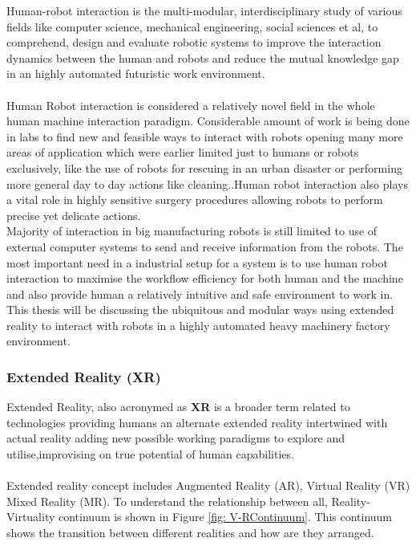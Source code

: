 \documentclass{article}
\begin{document}
Human-robot interaction is the multi-modular, interdisciplinary study of various fields like computer science, mechanical engineering, social sciences et al, to comprehend, design and evaluate robotic systems to improve the interaction dynamics between the human and robots and reduce the mutual knowledge gap in an highly automated futuristic work environment. \\ \\

Human Robot interaction is considered a relatively novel field in the whole human machine interaction paradigm. Considerable amount of work is being done in labs to find new and feasible ways to interact with robots opening many more areas of application which were earlier limited just to humans or robots exclusively, like the use of robots for rescuing in an urban disaster\cite{Murphy:2004:HIR:2220413.2220787} or performing more general day to day actions like cleaning.\cite{cleaningRobot}.Human robot interaction also plays a vital role in highly sensitive surgery procedures allowing robots to perform precise yet delicate actions.\cite{hriSurgery}\\

Majority of interaction in big manufacturing robots is still limited to use of external computer systems to send and receive information from the robots.
The most important need in a industrial setup for a system is to use human robot interaction to maximise the workflow efficiency for both human and the machine and also provide human a relatively intuitive and safe environment to work in.\\

This thesis will be discussing the ubiquitous and modular ways using extended reality to interact with robots in a highly automated heavy machinery factory environment.

\subsubsection{Extended Reality (XR)}

Extended Reality, also acronymed as \textbf{XR} is a broader term related to technologies providing humans an alternate extended reality intertwined with actual reality adding new possible working paradigms to explore and utilise,improvising on true potential of human capabilities.\\\\
Extended reality concept includes Augmented Reality (AR), Virtual Reality (VR) Mixed Reality (MR). To understand the relationship between all, Reality-Virtuality continuum is shown in Figure \ref{fig: V-RContinuum}. This continuum shows the transition between different realities and how are they arranged. \cite{reality-VirualContinuum}\\
\end{document}
